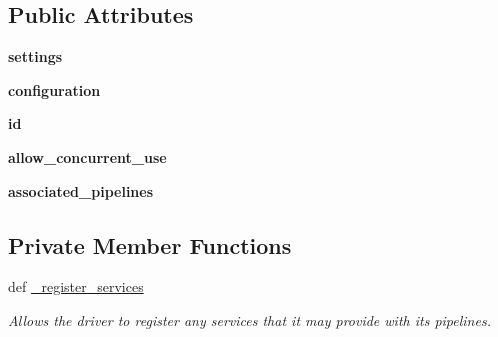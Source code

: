 \subsection*{Public Attributes}
\begin{DoxyCompactItemize}
\item 
\hypertarget{classhwm_1_1hardware_1_1devices_1_1drivers_1_1driver_1_1_driver_a2a973aaf5e90466b76e8fa07f5f08bb0}{{\bfseries settings}}\label{classhwm_1_1hardware_1_1devices_1_1drivers_1_1driver_1_1_driver_a2a973aaf5e90466b76e8fa07f5f08bb0}

\item 
\hypertarget{classhwm_1_1hardware_1_1devices_1_1drivers_1_1driver_1_1_driver_a2c32021a077473aa3c2d540379a7392f}{{\bfseries configuration}}\label{classhwm_1_1hardware_1_1devices_1_1drivers_1_1driver_1_1_driver_a2c32021a077473aa3c2d540379a7392f}

\item 
\hypertarget{classhwm_1_1hardware_1_1devices_1_1drivers_1_1driver_1_1_driver_af66caa85b0ccbe168d3628016dcab2a2}{{\bfseries id}}\label{classhwm_1_1hardware_1_1devices_1_1drivers_1_1driver_1_1_driver_af66caa85b0ccbe168d3628016dcab2a2}

\item 
\hypertarget{classhwm_1_1hardware_1_1devices_1_1drivers_1_1driver_1_1_driver_a37fd118d025a5171282413fa5d53e703}{{\bfseries allow\-\_\-concurrent\-\_\-use}}\label{classhwm_1_1hardware_1_1devices_1_1drivers_1_1driver_1_1_driver_a37fd118d025a5171282413fa5d53e703}

\item 
\hypertarget{classhwm_1_1hardware_1_1devices_1_1drivers_1_1driver_1_1_driver_acc72a2ae0d3b1f1679a84528c1ae0e13}{{\bfseries associated\-\_\-pipelines}}\label{classhwm_1_1hardware_1_1devices_1_1drivers_1_1driver_1_1_driver_acc72a2ae0d3b1f1679a84528c1ae0e13}

\end{DoxyCompactItemize}
\subsection*{Private Member Functions}
\begin{DoxyCompactItemize}
\item 
def \hyperlink{classhwm_1_1hardware_1_1devices_1_1drivers_1_1driver_1_1_driver_aad335460ab2748e4a13480dc5fc09a49}{\-\_\-register\-\_\-services}
\begin{DoxyCompactList}\small\item\em Allows the driver to register any services that it may provide with its pipelines. \end{DoxyCompactList}\end{DoxyCompactItemize}
